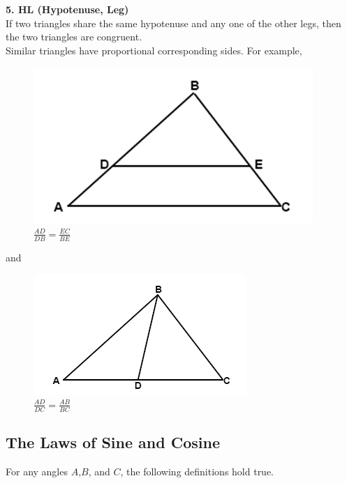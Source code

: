         \noindent \color{purple}\textbf{5. HL (Hypotenuse, Leg)}\color{black} \\
        \noindent If two triangles share the same hypotenuse and any one of the other legs,
        then the two triangles are congruent. \\

        \noindent Similar triangles have proportional corresponding sides. For example, \\

        \begin{figure} [hbt!]
            \centering
            \includegraphics[scale = 0.6] {Resources/Unit2Triangles/sim1.PNG}
            \caption*{$\frac{AD}{DB}=\frac{EC}{BE}$}
        \end{figure}

        \noindent and \\

        \begin{figure} [hbt!]
            \centering
            \includegraphics[scale = 0.8] {Resources/Unit2Triangles/sim2.PNG}
            \caption*{$\frac{AD}{DC}=\frac{AB}{BC}$}
        \end{figure}



    \subsection{The Laws of Sine and Cosine}
        For any angles $A$,$B$, and $C$, the following definitions hold true.

